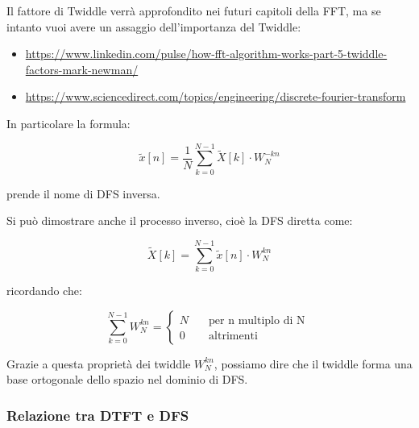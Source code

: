\begin{tcolorbox}
    Il fattore di Twiddle verrà approfondito nei futuri capitoli della FFT, ma se intanto vuoi avere un assaggio dell'importanza del Twiddle: 

    \begin{itemize}
        \item \url{https://www.linkedin.com/pulse/how-fft-algorithm-works-part-5-twiddle-factors-mark-newman/}
        \item \url{https://www.sciencedirect.com/topics/engineering/discrete-fourier-transform}
    \end{itemize}
\end{tcolorbox}

In particolare la formula: 

{
    \Large
    \begin{equation}
        \tilde{x} \left[ n\right]
        =
        \dfrac{1}{N}
        \sum_{k = 0}^{N -1}
        \tilde{X} \left[ k\right] \cdot W_N^{-k n}
    \end{equation}
}

prende il nome di DFS inversa. \newline 

Si può dimostrare anche il processo inverso, cioè la DFS diretta come: 

{
    \Large
    \begin{equation}
        \tilde{X} \left[ k\right]
        =
        \sum_{k = 0}^{N -1}
        \tilde{x} \left[ n\right] \cdot W_N^{k n}
    \end{equation}
}

ricordando che: 

{
    \Large 
    \begin{equation}
        \sum_{k = 0}^{N - 1}
        W_N^{kn} 
        = 
        \begin{cases}
            N \quad &\text{per n multiplo di N }
            \\
            0 \quad &\text{altrimenti }
        \end{cases}
    \end{equation}
}

Grazie a questa proprietà dei twiddle $W_N^{kn}$, possiamo dire che il twiddle forma una base ortogonale dello spazio nel dominio di DFS. \newline 

\newpage 

\subsubsection{Relazione tra DTFT e DFS}


